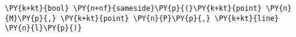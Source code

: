 \begin{Verbatim}[commandchars=\\\{\}]
    \PY{k+kt}{bool} \PY{n+nf}{sameside}\PY{p}{(}\PY{k+kt}{point} \PY{n}{M}\PY{p}{,} \PY{k+kt}{point} \PY{n}{P}\PY{p}{,} \PY{k+kt}{line} \PY{n}{l}\PY{p}{)}
\end{Verbatim}
